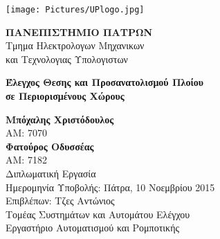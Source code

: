 \begin{titlepage}


 
  \begin{minipage}[c]{.2\linewidth}
    \texttt{[image: Pictures/UPlogo.jpg]}
  \end{minipage}\hfill
  \begin{minipage}[c]{.75\linewidth}
  \hfill \break
  \hfill \break

 
  
  \textsc{\large \textbf{ΠΑΝΕΠΙΣΤΗΜΙΟ ΠΑΤΡΩΝ} }\\
   Τμημα Ηλεκτρολογων Μηχανικων\\και Τεχνολογιας Υπολογιστων\\
  \end{minipage}
  

\vspace*{2cm} 

{ \LARGE \bfseries Έλεγχος Θεσης και Προσανατολισμού Πλοίου \\[0.3cm]σε Περιορισμένους Χώρους}
\\[0.4cm] %

\vspace*{1.5cm} 

{\large \textbf{Μπόχαλης Χριστόδουλος} } \\
ΑΜ: 7070 \\[0.5cm]
{\large \textbf{Φατούρος Οδυσσέας} }\\
ΑΜ: 7182 \\ [3cm]


 
{\Large Διπλωματική Εργασία} \\
Ημερομηνία Υποβολής:\hspace{0.3cm} Πάτρα, 10 Νοεμβρίου 2015 \\
Επιβλέπων: \hspace{2.25cm} Τζες Αντώνιος \\[0.5cm]

Τομέας Συστημάτων και Αυτομάτου Ελέγχου \\
Εργαστήριο Αυτοματισμού και Ρομποτικής


\vfill %

\end{titlepage}

\newpage \thispagestyle{empty} \mbox{}